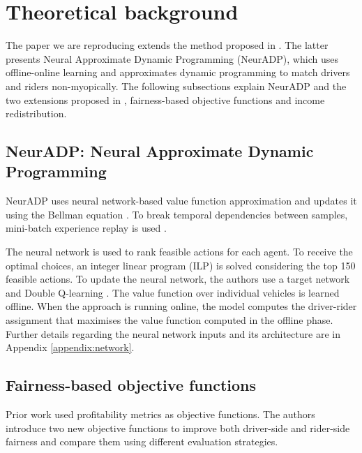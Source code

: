 \section{Theoretical background} \label{sec:Theoretical Background}

The paper we are reproducing extends the method proposed in \citet{shah20}. The latter presents Neural Approximate Dynamic Programming (NeurADP), which uses offline-online learning and approximates dynamic programming to match drivers and riders non-myopically. The following subsections explain NeurADP and the two extensions proposed in \citet{raman21}, fairness-based objective functions and income redistribution.

\subsection{NeurADP: Neural Approximate Dynamic Programming}
NeurADP uses neural network-based value function approximation and updates it using the Bellman equation \cite{mnih2015}. To break temporal dependencies between samples, mini-batch experience replay is used \citep{lin1992self}.

The neural network is used to rank feasible actions for each agent. To receive the optimal choices, an integer linear program (ILP) is solved considering the top 150 feasible actions. To update the neural network, the authors use a target network and Double Q-learning \cite{van2016deep}. The value function over individual vehicles is learned offline. When the approach is running online, the model computes the driver-rider assignment that maximises the value function computed in the offline phase. Further details regarding the neural network inputs and its architecture are in Appendix \ref{appendix:network}.

\subsection{Fairness-based objective functions}
Prior work used profitability metrics as objective functions. The authors introduce two new objective functions to improve both driver-side and rider-side fairness \cite{raman21} and compare them using different evaluation strategies.


